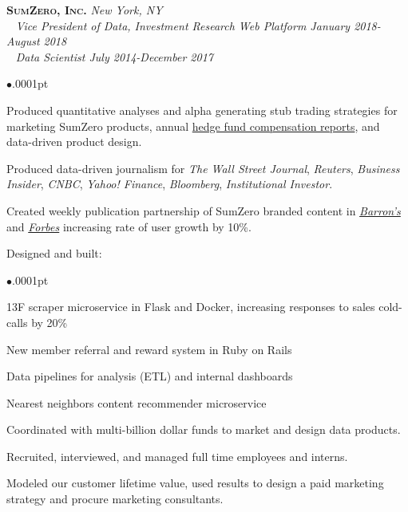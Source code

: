\documentclass[11pt]{article}
\newcommand{\employer}[4]{
	{\hspace*{-20pt} {\small{\textbf{\textsc{ #1}}}}
  \hfill \small{\emph{#2}}\\ ~\hspace*{-20pt} \small \emph{ #3 \hfill #4}}\\ }
\newcommand{\position}[2]
	{ ~\hspace*{-20pt} \small \emph{ #1 \hfill #2}}
\newenvironment{achievements}{\begin{list}{$\bullet$}{\topsep .0001pt \itemsep -2pt}}{\vspace*{5pt}\end{list} }
\begin{document}
\employer{SumZero, Inc.}{New York, NY}{Vice President of Data, Investment Research Web Platform}{January 2018-August 2018}
\position{Data Scientist}{July 2014-December 2017}
	\begin{achievements}
		\item Produced quantitative analyses and alpha generating stub trading strategies for marketing SumZero products, annual \href{https://sumzero.com/sp/szcomp2017}{hedge fund compensation reports}, and data-driven product design. 
		\item Produced data-driven journalism for \emph{The Wall Street Journal}, \emph{Reuters}, \emph{Business Insider},     \emph{CNBC}, \emph{Yahoo! Finance}, \emph{Bloomberg}, \emph{Institutional Investor}.
		\item Created weekly publication partnership of SumZero branded content in         \href{http://www.barrons.com/search?keyword=view+from+the+buyside+sumzero&numResults=15&sort=date-desc&author=&searchWindow=0&minDate=&maxDate=&source=barrons}{\emph{Barron's}} and           \href{https://www.forbes.com/sites/lukeschiefelbein/#7442bc65216e}{\emph{Forbes}} increasing rate of user growth by 10\%.
		\item Designed and built:
		\begin{achievements}
		\item 13F scraper microservice in Flask and Docker, increasing responses to sales cold-calls by 20\%
		\item New member referral and reward system in Ruby on Rails
		\item Data pipelines for analysis (ETL) and internal dashboards
		\item Nearest neighbors content recommender microservice
		\end{achievements}
		\item Coordinated with multi-billion dollar funds to market and design data products.
		\item Recruited, interviewed, and managed full time employees and interns.
		\item Modeled our customer lifetime value, used results to design a paid marketing strategy and procure marketing  consultants.
	\end{achievements}
\end{document}
